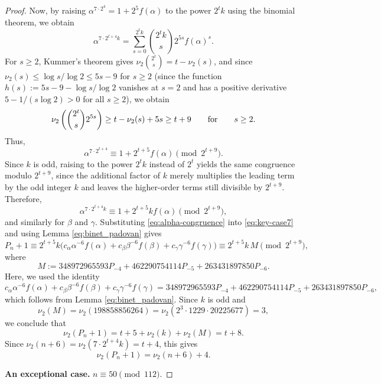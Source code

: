 \documentclass[11pt,a4paper]{article}
\numberwithin{equation}{section}
\numberwithin{table}{section}
\numberwithin{figure}{section}
\begin{document}
\begin{proof}
	Now, by raising $\alpha^{7\cdot 2^4}=1+2^5 f(\alpha)$ 
	to the power $2^tk$ using the binomial theorem, we obtain
	\begin{equation*}
		\alpha^{7\cdot 2^{t+4}k} 
		= \sum_{s=0}^{2^t k}\binom{2^t k}{s} 2^{5s}f(\alpha)^s.
	\end{equation*}
	For $s\ge 2$, Kummer's theorem gives 
	$\nu_2\binom{2^t}{s}=t-\nu_2(s)$, and since 
	$\nu_2(s)\le \log s/\log 2\le 5s-9$ for $s\ge 2$ 
	(since the function $h(s):=5s-9-\log s/\log 2$ vanishes 
	at $s=2$ and has a positive derivative $5-1/(s\log 2)>0$ 
	for all $s\ge 2$), 
	we obtain
	\begin{equation*}
		\nu_2\left(\binom{2^t}{s}2^{5s}\right) 
		\ge t-\nu_2(s)+5s \ge t+9\qquad {\text{\rm for}}\qquad s\ge 2.
	\end{equation*}
	Thus, 
	$$\alpha^{7\cdot 2^{t+4}}\equiv 1+2^{t+5}f(\alpha)\pmod {2^{t+9}}.
	$$
Since $k$ is odd, raising to the power $2^t k$ instead of $2^t$ yields the same congruence modulo $2^{t+9}$, since the additional factor of $k$ merely multiplies the leading term by the odd integer $k$ and leaves the higher-order terms still divisible by $2^{t+9}$. Therefore,
	\begin{equation}\label{eq:alpha-congruence}
		\alpha^{7\cdot 2^{t+4}k} 
		\equiv 1+2^{t+5}kf(\alpha)\pmod{2^{t+9}},
	\end{equation}
	and similarly for $\beta$ and $\gamma$. Substituting 
	\eqref{eq:alpha-congruence} into \eqref{eq:key-case7} 
	and using Lemma \ref{eq:binet_padovan} gives
	$$
		P_n+1 
		\equiv 2^{t+5}k\bigl(c_{\alpha}\alpha^{-6}f(\alpha)
		+c_{\beta}\beta^{-6}f(\beta)
		+c_{\gamma}\gamma^{-6}f(\gamma)\bigr)\equiv 2^{t+5}k\,M\pmod{2^{t+9}},
	$$
	where
	$$
		M := 348972965593P_{-4}
		+462290754114P_{-5}
		+263431897850P_{-6}.
	$$
	Here, we used the identity 
	$$c_{\alpha}\alpha^{-6}f(\alpha)+c_{\beta}\beta^{-6}f(\beta)
	+c_{\gamma}\gamma^{-6}f(\gamma)=348972965593P_{-4}+462290754114P_{-5}	+263431897850P_{-6},$$
 which follows from Lemma \ref{eq:binet_padovan}. Since $k$ is odd and 
 $$
 \nu_2(M)=\nu_2(198858856264)=\nu_{2}(2^3\cdot 1229\cdot 20225677)=3,
 $$ 
 we conclude that
	\begin{equation*}
		\nu_2(P_n+1) = t+5+\nu_2(k)+\nu_2(M) 
		= t+8.
	\end{equation*}
	Since $\nu_2(n+6)=\nu_2(7\cdot 2^{t+4}k)=t+4$, this gives
	\begin{equation*}
		\nu_2(P_n+1) = \nu_2(n+6)+4.
	\end{equation*}
	
	\medskip
	\noindent\textbf{An exceptional case.} $n\equiv 50\pmod{112}$.
	

\end{proof}
\end{document}
